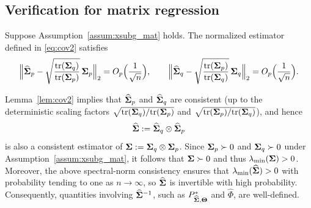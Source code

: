 \documentclass[authoryear,preprint,review,12pt]{elsarticle}
\begin{document}
\subsection{Verification for matrix regression} 

\begin{Lemma}\label{lem:cov2}
	Suppose Assumption~\ref{assum:xsubg_mat} holds. The normalized estimator defined in \eqref{eq:cov2} satisfies
	\[
	\Big\|\widehat{\mathbf{ \Sigma}}_p - \sqrt{\frac{\mbox{tr}(\mathbf{ \Sigma}_q)}{\mbox{tr}(\mathbf{ \Sigma}_p)}}\, \mathbf{ \Sigma}_p\Big\|_2
	= O_p\Big(\frac{1}{\sqrt{n}}\Big),
	\qquad
	\Big\|\widehat{\mathbf{ \Sigma}}_q - \sqrt{\frac{\mbox{tr}(\mathbf{ \Sigma}_p)}{\mbox{tr}(\mathbf{ \Sigma}_q)}}\, \mathbf{ \Sigma}_q\Big\|_2
	= O_p\Big(\frac{1}{\sqrt{n}}\Big).
	\] 
\end{Lemma}
\begin{remark}\label{rem:cov2_invertible}
	Lemma~\ref{lem:cov2} implies that $\widehat{\mathbf{ \Sigma}}_p$ and $\widehat{\mathbf{ \Sigma}}_q$ are consistent
	(up to the deterministic scaling factors
	$\sqrt{\mbox{tr}(\mathbf{ \Sigma}_q)/\mbox{tr}(\mathbf{ \Sigma}_p)}$ and $\sqrt{\mbox{tr}(\mathbf{ \Sigma}_p)/\mbox{tr}(\mathbf{ \Sigma}_q)}$), and hence
	\[
	\widehat{\mathbf{ \Sigma}} := \widehat{\mathbf{ \Sigma}}_q \otimes \widehat{\mathbf{ \Sigma}}_p
	\]
	is also a consistent estimator of $\mathbf{ \Sigma} := \mathbf{ \Sigma}_q \otimes \mathbf{ \Sigma}_p$.
	Since $\mathbf{ \Sigma}_p\succ 0$ and $\mathbf{ \Sigma}_q\succ 0$ under Assumption~\ref{assum:xsubg_mat},
	it follows that $\mathbf{ \Sigma}\succ 0$ and thus $\lambda_{\min}(\mathbf{ \Sigma})>0$.
	Moreover, the above spectral-norm consistency ensures that $\lambda_{\min}(\widehat{\mathbf{ \Sigma}})>0$
	with probability tending to one as $n\to\infty$, so $\widehat{\mathbf{ \Sigma}}$ is invertible with high probability.
	Consequently, quantities involving $\widehat{\mathbf{ \Sigma}}^{-1}$, such as
	$P_{\widehat{\mathbf{ \Sigma}},\mathbf{\Theta}}^{\ast}$ and $\widehat\Phi$, are well-defined.
\end{remark}
\end{document}
